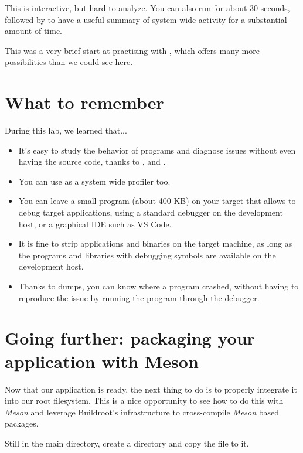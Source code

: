 This is interactive, but hard to analyze. You can also run  for about 30 seconds, followed by  to have
a useful summary of system wide activity for a substantial amount of time.

This was a very brief start at practising with , which offers
many more possibilities than we could see here.

\section{What to remember}

During this lab, we learned that...

\begin{itemize}
\item It's easy to study the behavior of programs and diagnose issues
  without even having the source code, thanks to ,
   and .

\item You can use  as a system wide profiler too.

\item You can leave a small  program (about 400 KB) on your target
  that allows to debug target applications, using a standard 
  debugger on the development host, or a graphical IDE such as VS Code.

\item It is fine to strip applications and binaries on the target
  machine, as long as the programs and libraries with debugging
  symbols are available on the development host.

\item Thanks to  dumps, you can know where a program crashed,
  without having to reproduce the issue by running the program through
  the debugger.
\end{itemize}

\section{Going further: packaging your application with Meson}

Now that our application is ready, the next thing to do is to properly
integrate it into our root filesystem. This is a nice opportunity to see
how to do this with {\em Meson} and leverage Buildroot's
infrastructure to cross-compile {\em Meson} based packages.

Still in the main  directory, create a
 directory and copy the
 file to it.

